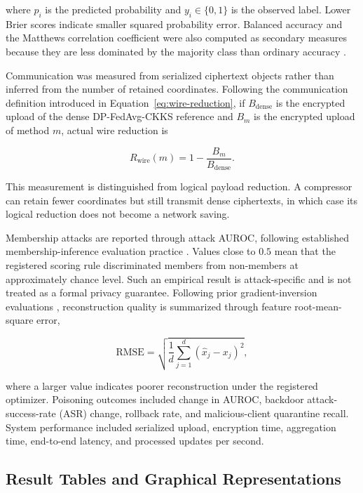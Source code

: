where $p_i$ is the predicted probability and $y_i\in\{0,1\}$ is the observed label. Lower Brier scores indicate smaller squared probability error. Balanced accuracy and the Matthews correlation coefficient were also computed as secondary measures because they are less dominated by the majority class than ordinary accuracy \cite{powers2011evaluation,chicco2020mcc}.

Communication was measured from serialized ciphertext objects rather than inferred from the number of retained coordinates. Following the communication definition introduced in Equation~\ref{eq:wire-reduction}, if $B_{\mathrm{dense}}$ is the encrypted upload of the dense DP-FedAvg-CKKS reference and $B_m$ is the encrypted upload of method $m$, actual wire reduction is

\begin{equation}
    R_{\mathrm{wire}}(m)=1-\frac{B_m}{B_{\mathrm{dense}}}.
    \label{eq:ch4-wire-reduction}
\end{equation}

This measurement is distinguished from logical payload reduction. A compressor can retain fewer coordinates but still transmit dense ciphertexts, in which case its logical reduction does not become a network saving.

Membership attacks are reported through attack AUROC, following established membership-inference evaluation practice \cite{shokri2017membership,carlini2022membership}. Values close to $0.5$ mean that the registered scoring rule discriminated members from non-members at approximately chance level. Such an empirical result is attack-specific and is not treated as a formal privacy guarantee. Following prior gradient-inversion evaluations \cite{zhu2019dlg,geiping2020inverting}, reconstruction quality is summarized through feature root-mean-square error,

\begin{equation}
    \mathrm{RMSE}=\sqrt{\frac{1}{d}\sum_{j=1}^{d}(\hat{x}_j-x_j)^2},
    \label{eq:ch4-reconstruction-rmse}
\end{equation}

where a larger value indicates poorer reconstruction under the registered optimizer. Poisoning outcomes included change in AUROC, backdoor attack-success-rate (ASR) change, rollback rate, and malicious-client quarantine recall. System performance included serialized upload, encryption time, aggregation time, end-to-end latency, and processed updates per second.

\subsection{Result Tables and Graphical Representations}
\label{subsec:results-tables-figures}

